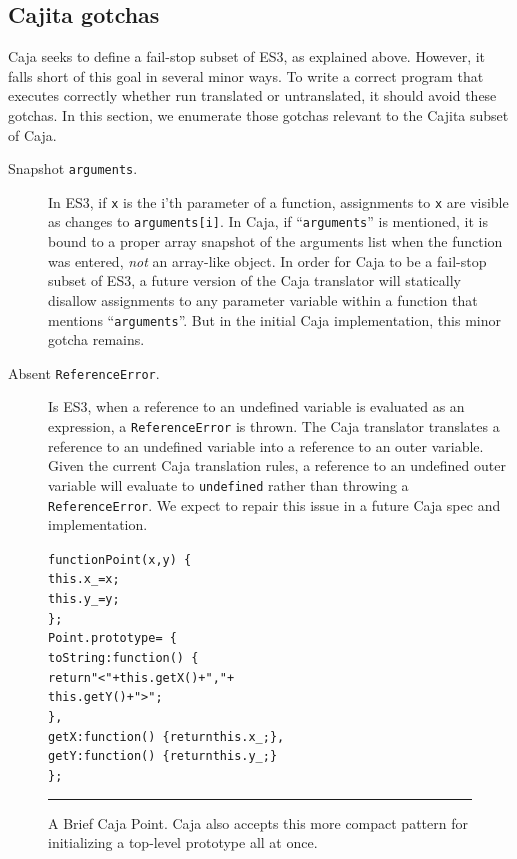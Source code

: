 \documentclass[letterpaper,twocolumn,10pt]{article}
\newcommand{\code}[1]{{\tt {#1}}}              %
\begin{document}
\subsection{Cajita gotchas}

Caja seeks to define a fail-stop subset of ES3, as explained above. However, 
it falls short of this goal in several minor ways. To write a correct program 
that executes correctly whether run translated or untranslated, it should 
avoid these gotchas. In this section, we enumerate those gotchas relevant to 
the Cajita subset of Caja.

\begin{description}

  \item[Snapshot \code{arguments}.] In ES3, if \code{x} is the i'th parameter 
  of a function, assignments to \code{x} are visible as changes to 
  \code{arguments[i]}. In Caja, if ``\code{arguments}'' is mentioned, it is 
  bound to a proper array snapshot of the arguments list when the function 
  was entered, \emph{not} an array-like object. In order for Caja to be a 
  fail-stop subset of ES3, a future version of the Caja translator will 
  statically disallow assignments to any parameter variable within a function 
  that mentions ``\code{arguments}''. But in the initial Caja implementation, 
  this minor gotcha remains.
  
  \item[Absent \code{ReferenceError}.] Is ES3, when a reference to an 
  undefined variable is evaluated as an expression, a \code{ReferenceError} 
  is thrown. The Caja translator translates a reference to an undefined 
  variable into a reference to an outer variable. Given the current Caja 
  translation rules, a reference to an undefined outer variable will evaluate
  to \code{undefined} rather than throwing a \code{ReferenceError}. We expect
  to repair this issue in a future Caja spec and implementation.
  
\end{description}

\begin{figure}[t!]
\begin{alltt}
function Point(x, y)\ \{
  this.x\_ = x;
  this.y\_ = y;
\};
Point.prototype =\ \{
  toString: function()\ \{ 
    return "<" + this.getX() + "," + 
                 this.getY() + ">"; 
  \},
  getX: function()\ \{ return this.x\_; \},
  getY: function()\ \{ return this.y\_; \}
\};
\end{alltt}

\caption[A Brief Caja Point.]{A Brief Caja Point. Caja also accepts this more
compact pattern for initializing a top-level prototype all at once.
\\ } \hrule
\label{fig:brief-caja-point}
\end{figure}
\end{document}
